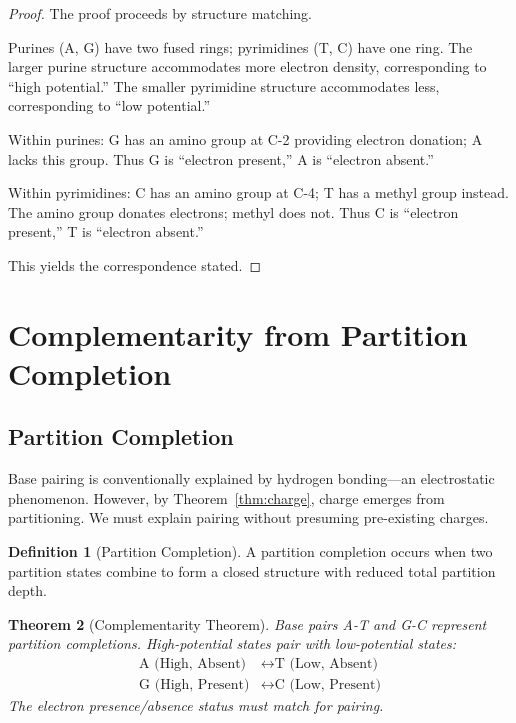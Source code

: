 \documentclass[twocolumn,10pt,a4paper]{article}
\newtheorem{theorem}{Theorem}[section]
\theoremstyle{definition}
\newtheorem{definition}[theorem]{Definition}
\theoremstyle{remark}
\begin{document}
\begin{proof}
The proof proceeds by structure matching.

Purines (A, G) have two fused rings; pyrimidines (T, C) have one ring. The larger purine structure accommodates more electron density, corresponding to ``high potential.'' The smaller pyrimidine structure accommodates less, corresponding to ``low potential.''

Within purines: G has an amino group at C-2 providing electron donation; A lacks this group. Thus G is ``electron present,'' A is ``electron absent.''

Within pyrimidines: C has an amino group at C-4; T has a methyl group instead. The amino group donates electrons; methyl does not. Thus C is ``electron present,'' T is ``electron absent.''

This yields the correspondence stated.
\end{proof}

\section{Complementarity from Partition Completion}
\label{sec:complementarity}

\subsection{Partition Completion}

Base pairing is conventionally explained by hydrogen bonding---an electrostatic phenomenon. However, by Theorem~\ref{thm:charge}, charge emerges from partitioning. We must explain pairing without presuming pre-existing charges.

\begin{definition}[Partition Completion]
\label{def:completion}
A partition completion occurs when two partition states combine to form a closed structure with reduced total partition depth.
\end{definition}

\begin{theorem}[Complementarity Theorem]
\label{thm:complementarity}
Base pairs A-T and G-C represent partition completions. High-potential states pair with low-potential states:
\begin{align}
    \text{A (High, Absent)} &\leftrightarrow \text{T (Low, Absent)} \\
    \text{G (High, Present)} &\leftrightarrow \text{C (Low, Present)}
\end{align}
The electron presence/absence status must match for pairing.
\end{theorem}
\end{document}

